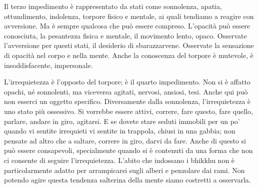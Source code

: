 Il terzo impedimento è rappresentato da stati come sonnolenza, apatia,
ottundimento, indolenza, torpore fisico e mentale, ai quali tendiamo a
reagire con avversione. Ma è sempre qualcosa che può essere compreso.
L'opacità può essere conosciuta, la pesantezza fisica e mentale, il
movimento lento, opaco. Osservate l'avversione per questi stati, il
desiderio di sbarazzarvene. Osservate la sensazione di opacità nel corpo
e nella mente. Anche la conoscenza del torpore è mutevole, è
insoddisfacente, impersonale.

L'irrequietezza è l'opposto del torpore; è il quarto impedimento. Non si
è affatto opachi, né sonnolenti, ma viceversa agitati, nervosi, ansiosi,
tesi. Anche qui può non esserci un oggetto specifico. Diversamente dalla
sonnolenza, l'irrequietezza è uno stato più ossessivo. Si vorrebbe
essere attivi, correre, fare questo, fare quello, parlare, andare in
giro, agitarsi. E se dovete stare seduti immobili per un po' quando vi
sentite irrequieti vi sentite in trappola, chiusi in una gabbia; non
pensate ad altro che a saltare, correre in giro, darvi da fare. Anche di
questo si può essere consapevoli, specialmente quando si è contenuti da
una forma che non ci consente di seguire l'irrequietezza. L'abito che
indossano i bhikkhu non è particolarmente adatto per arrampicarsi sugli
alberi e penzolare dai rami. Non potendo agire questa tendenza salterina
della mente siamo costretti a osservarla.

